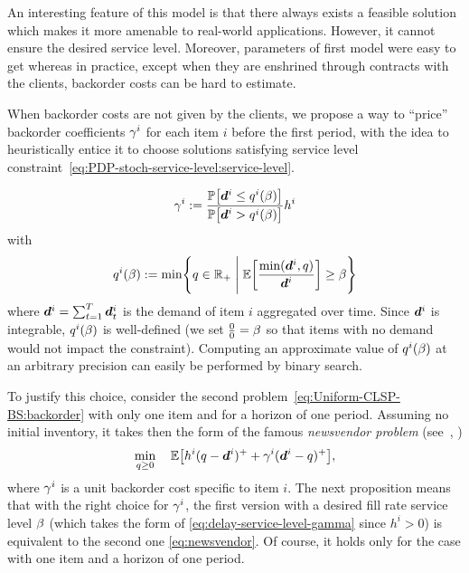 An interesting feature of this model is that there always exists a feasible solution which makes it more amenable to real-world applications. However, it cannot ensure the desired service level. Moreover, parameters of first model were easy to get whereas in practice, except when they are enshrined through contracts with the clients, backorder costs can be hard to estimate.

\medskip

When backorder costs are not given by the clients, we propose a way to ``price'' backorder coefficients $\gamma^i$ for each item $i$ before the first period, with the idea to heuristically entice it to choose solutions satisfying service level constraint~\eqref{eq:PDP-stoch-service-level:service-level}.

\begin{equation}
\backorder^i := \frac{\prob\sqbracket{\va\demand^i \le q^i(\servicelvl)}}{\prob\sqbracket{\va\demand^i>q^i(\servicelvl)}} \holding^i
\label{eq:delay-service-level-gamma}
\end{equation}
with
\begin{equation}
q^i(\servicelvl) :=
\min \crbracket{
  q\in \RR_+ \; \Bigg| \; \espe\sqbracket{\frac{\min(\va\demand^i,q)}{\va\demand^i}} \ge \servicelvl
}
\label{eq:delay-service-level-ell}
\end{equation}
where $\va\demand^i = \sum_{t=1}^{\horizon} \va \demand_t^i$ is the demand of item $i$ aggregated over time. Since $\va \demand^i$ is integrable, $q^i(\beta)$ is well-defined
(we set $\frac{0}{0}=\beta$ so that items with no demand would not impact the constraint).
Computing an approximate value of $q^i(\beta)$ at an arbitrary precision can easily be performed by binary search.


To justify this choice, consider the second problem~\eqref{eq:Uniform-CLSP-BS:backorder} with only one item and for a horizon of one period. Assuming no initial inventory, it takes then the form of the famous \emph{newsvendor problem} (see~\eg, \cite[Chapter 1]{Shapiro2009})
\begin{equation}
\label{eq:newsvendor}
\min_{q\ge 0} \quad \espe\sqbracket{h^i (q - \va d^i )^+ + \backorder^i ( \va d^i - q)^+},
\end{equation}
where $\gamma^i$ is a unit backorder cost specific to item $i$.
The next proposition means that with the right choice for $\gamma^i$, the first version with a desired fill rate service level $\beta$ (which takes the form of \eqref{eq:delay-service-level-gamma} since $h^i>0$) is equivalent to the second one \eqref{eq:newsvendor}. Of course, it holds only for the case with one item and a horizon of one period.

